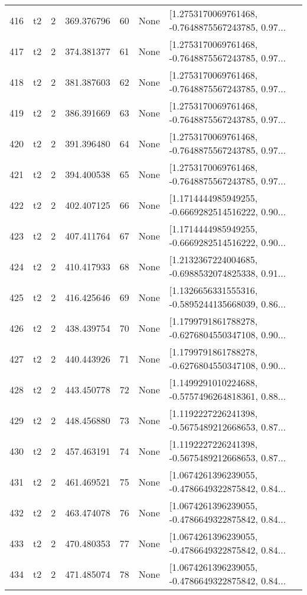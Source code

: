 \begin{tabular}{lllrlll}
416 &  t2 &   2 &   369.376796 &   60 &  None &  [1.2753170069761468, -0.7648875567243785, 0.97... \\
417 &  t2 &   2 &   374.381377 &   61 &  None &  [1.2753170069761468, -0.7648875567243785, 0.97... \\
418 &  t2 &   2 &   381.387603 &   62 &  None &  [1.2753170069761468, -0.7648875567243785, 0.97... \\
419 &  t2 &   2 &   386.391669 &   63 &  None &  [1.2753170069761468, -0.7648875567243785, 0.97... \\
420 &  t2 &   2 &   391.396480 &   64 &  None &  [1.2753170069761468, -0.7648875567243785, 0.97... \\
421 &  t2 &   2 &   394.400538 &   65 &  None &  [1.2753170069761468, -0.7648875567243785, 0.97... \\
422 &  t2 &   2 &   402.407125 &   66 &  None &  [1.1714444985949255, -0.6669282514516222, 0.90... \\
423 &  t2 &   2 &   407.411764 &   67 &  None &  [1.1714444985949255, -0.6669282514516222, 0.90... \\
424 &  t2 &   2 &   410.417933 &   68 &  None &  [1.2132367224004685, -0.6988532074825338, 0.91... \\
425 &  t2 &   2 &   416.425646 &   69 &  None &  [1.1326656331555316, -0.5895244135668039, 0.86... \\
426 &  t2 &   2 &   438.439754 &   70 &  None &  [1.1799791861788278, -0.6276804550347108, 0.90... \\
427 &  t2 &   2 &   440.443926 &   71 &  None &  [1.1799791861788278, -0.6276804550347108, 0.90... \\
428 &  t2 &   2 &   443.450778 &   72 &  None &  [1.1499291010224688, -0.5757496264818361, 0.88... \\
429 &  t2 &   2 &   448.456880 &   73 &  None &  [1.1192227226241398, -0.5675489212668653, 0.87... \\
430 &  t2 &   2 &   457.463191 &   74 &  None &  [1.1192227226241398, -0.5675489212668653, 0.87... \\
431 &  t2 &   2 &   461.469521 &   75 &  None &  [1.0674261396239055, -0.4786649322875842, 0.84... \\
432 &  t2 &   2 &   463.474078 &   76 &  None &  [1.0674261396239055, -0.4786649322875842, 0.84... \\
433 &  t2 &   2 &   470.480353 &   77 &  None &  [1.0674261396239055, -0.4786649322875842, 0.84... \\
434 &  t2 &   2 &   471.485074 &   78 &  None &  [1.0674261396239055, -0.4786649322875842, 0.84... \\

\end{tabular}
